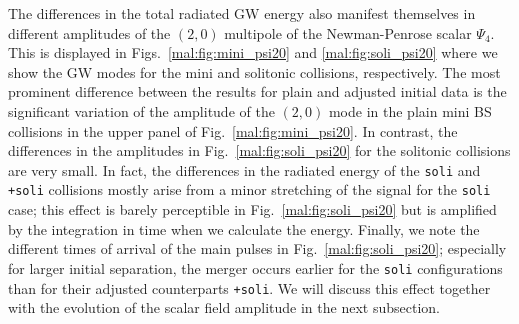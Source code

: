 The differences in the total radiated GW energy also manifest themselves
in different amplitudes of the $(2,0)$ multipole of the Newman-Penrose
scalar $\Psi_4$. This is displayed in Figs.~\ref{mal:fig:mini_psi20}
and \ref{mal:fig:soli_psi20} where we show the GW modes for the mini and
solitonic collisions, respectively. The most prominent difference
between the results for plain and adjusted initial data is the
significant variation of the amplitude of the $(2,0)$ mode in the
plain mini BS collisions in the upper panel of Fig.~\ref{mal:fig:mini_psi20}.
In contrast, the differences in the amplitudes in Fig.~\ref{mal:fig:soli_psi20}
for the solitonic collisions are very small. In fact, the differences
in the radiated energy of the {\tt soli} and {\tt +soli} collisions mostly
arise from a minor stretching of the signal for the {\tt soli} case; this
effect is barely perceptible in Fig.~\ref{mal:fig:soli_psi20} but is amplified
by the integration in time when we calculate the energy. Finally, we note
the different times of arrival of the main pulses in Fig.~\ref{mal:fig:soli_psi20};
especially for larger initial separation, the merger occurs earlier for
the {\tt soli} configurations than for their adjusted counterparts
{\tt +soli}.
We will discuss this effect together with the evolution
of the scalar field amplitude in the next subsection.



